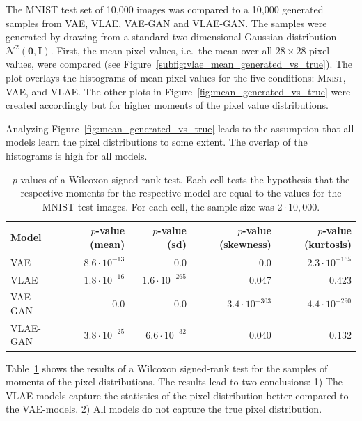 The MNIST test set of 10,000 images was compared to a 10,000 generated samples from \ac{VAE}, \ac{VLAE}, \ac{VAE}-\ac{GAN} and \ac{VLAE}-\ac{GAN}.
The samples were generated by drawing from a standard two-dimensional Gaussian distribution $\mathcal{N}^2(\bm{0},\bm{I})$.
First, the mean pixel values, i.e.~the mean over all $28\times 28$ pixel values, were compared (see Figure~\ref{subfig:vlae_mean_generated_vs_true}).
The plot overlays the histograms of mean pixel values for the five conditions: \textsc{Mnist}, \ac{VAE}, and \ac{VLAE}.
The other plots in Figure~\ref{fig:mean_generated_vs_true} were created accordingly but for higher moments of the pixel value distributions.

Analyzing Figure~\ref{fig:mean_generated_vs_true} leads to the assumption that all models learn the pixel distributions to some extent.
The overlap of the histograms is high for all models.
\begin{table}
    \begin{tabular}{lrrrr}
        \toprule
        Model              & $p$-value (mean)    & $p$-value (sd)       & $p$-value (skewness) & $p$-value (kurtosis) \\
        \midrule
        \ac{VAE}           & $8.6\cdot 10^{-13}$ & 0.0                  & 0.0                  & $2.3\cdot 10^{-165}$ \\
        \ac{VLAE}          & $1.8\cdot 10^{-16}$ & $1.6\cdot 10^{-265}$ & 0.047                & 0.423                \\
        \ac{VAE}-\ac{GAN}  & 0.0                 & 0.0                  & $3.4\cdot 10^{-303}$ & $4.4\cdot 10^{-290}$ \\
        \ac{VLAE}-\ac{GAN} & $3.8\cdot 10^{-25}$ & $6.6\cdot 10^{-32}$  & 0.040                & 0.132                \\
        \bottomrule
    \end{tabular}
    \caption{$p$-values of a Wilcoxon signed-rank test. Each cell tests the hypothesis that the respective moments for the respective model are equal to the values for the \textsc{MNIST} test images. For each cell, the sample size was $2\cdot 10,000$.}
    \label{tab:vae-vlae-mnist}
\end{table}
Table~\ref{tab:vae-vlae-mnist} shows the results of a Wilcoxon signed-rank test for the samples of moments of the pixel distributions.
The results lead to two conclusions: 1) The \ac{VLAE}-models capture the statistics of the pixel distribution better compared to the \ac{VAE}-models.
2) All models do not capture the true pixel distribution.

